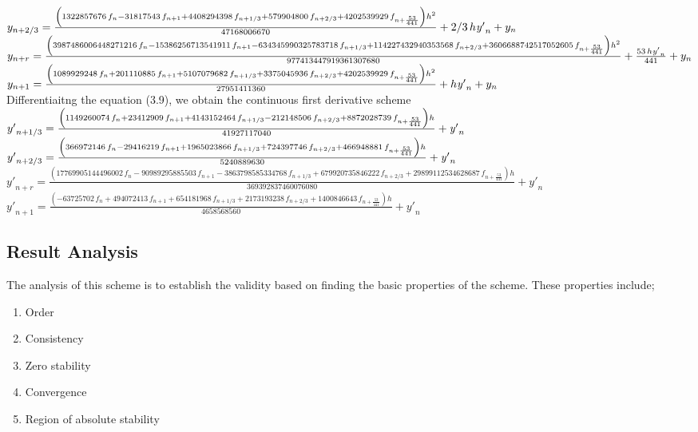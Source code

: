 \documentclass[12pt]{article}
\begin{document}
$y_{{n+2/3}}={\frac { \left( 1322857676\,f_{{n}}-31817543\,f_{{n+1}}+
		4408294398\,f_{{n+1/3}}+579904800\,f_{{n+2/3}}+4202539929\,f_{{n+{
					\frac{53}{441}}}} \right) {h}^{2}}{47168006670}}+2/3\,h{\it y'}_{{n}}+
y_{{n}}
$\\

$y_{{n+r}}={\frac { \left( 3987486006448271216\,f_{{n}}-
		15386256713541911\,f_{{n+1}}-634345990325783718\,f_{{n+1/3}}+
		114227432940353568\,f_{{n+2/3}}+3606688742517052605\,f_{{n+{\frac{53}{
						441}}}} \right) {h}^{2}}{977413447919361307680}}+{\frac {53\,h{\it y'}
		_{{n}}}{441}}+y_{{n}}
$\\

$y_{{n+1}}={\frac { \left( 1089929248\,f_{{n}}+201110885\,f_{{n+1}}+
		5107079682\,f_{{n+1/3}}+3375045936\,f_{{n+2/3}}+4202539929\,f_{{n+{
					\frac{53}{441}}}} \right) {h}^{2}}{27951411360}}+h{\it y'}_{{n}}+y_{{n
}}
$\\

\noindent Differentiaitng the equation (3.9), we obtain the continuous first derivative scheme\\

${y'}_{{n+1/3}}={\frac{\left(1149260074\,f_{{n}}+23412909\,f_{{n+1}}+4143152464\,f_{{n+1/3}}-212148506\,f_{{n+2/3}}+8872028739\,f_{{n+{\frac{53}{441}}}}\right) h}{41927117040}}+{\it y'}_{{n}}$\\

${y'}_{{n+2/3}}={\frac{\left(366972146\,f_{{n}}-29416219\,f_{{n+1}}+1965023866\,f_{{n+1/3}}+724397746\,f_{{n+2/3}}+466948881\,f_{{n+{\frac{53}{441}}}} \right) h}{5240889630}}+{\it y'}_{{n}}$\\

${y'}_{n+r}={\frac{\left(17769905144496002\,f_{{n}}-90989295885503\,f_{{n+1}}-3863798585334768\,f_{{n+1/3}}+679920735846222\,f_{{n+2/3}}+29899112534628687\,f_{{n+{\frac{53}{441}}}}\right)h}{369392837460076080}}+{y'}_{{n}}$\\

${y'}_{{n+1}}={\frac{\left(-63725702\,f_{{n}}+494072413\,f_{{n+1}}+654181968\,f_{{n+1/3}}+2173193238\,f_{{n+2/3}}+1400846643\,f_{{n+{\frac{53}{441}}}}\right)h}{4658568560}}+{ y'}_{{n}}$



\subsection{Result Analysis}
\noindent The analysis of this scheme is to establish the validity based on finding the basic properties of the scheme. These properties include;
\begin{enumerate}
	\item Order
	\item Consistency
	\item Zero stability
	\item Convergence
	\item Region of absolute stability
\end{enumerate}
\end{document}
